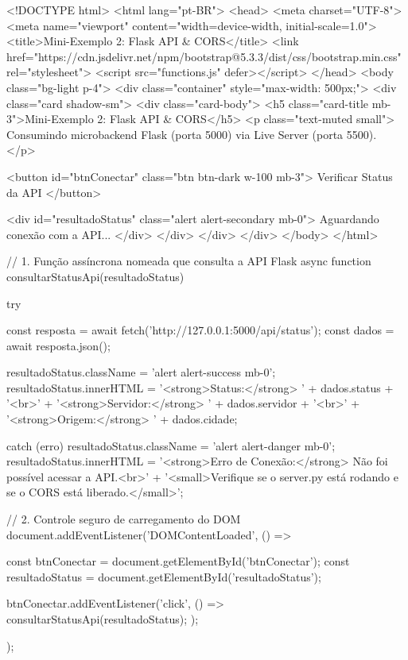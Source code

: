 \begin{boxCodigoHTML}
<!DOCTYPE html>
<html lang="pt-BR">
<head>
  <meta charset="UTF-8">
  <meta name="viewport" content="width=device-width, initial-scale=1.0">
  <title>Mini-Exemplo 2: Flask API & CORS</title>
  <link
    href="https://cdn.jsdelivr.net/npm/bootstrap@5.3.3/dist/css/bootstrap.min.css"
    rel="stylesheet">
  <script src="functions.js" defer></script>
</head>
<body class="bg-light p-4">
  <div class="container" style="max-width: 500px;">
    <div class="card shadow-sm">
      <div class="card-body">
        <h5 class="card-title mb-3">Mini-Exemplo 2: Flask API & CORS</h5>
        <p class="text-muted small">
          Consumindo microbackend Flask (porta 5000) via Live Server (porta 5500).
        </p>
        
        <button id="btnConectar" class="btn btn-dark w-100 mb-3">
          Verificar Status da API
        </button>

        <div id="resultadoStatus" class="alert alert-secondary mb-0">
          Aguardando conexão com a API...
        </div>
      </div>
    </div>
  </div>
</body>
</html>
\end{boxCodigoHTML}

\begin{boxCodigoJS}
// 1. Função assíncrona nomeada que consulta a API Flask
async function consultarStatusApi(resultadoStatus) {
  try {
    const resposta = await fetch('http://127.0.0.1:5000/api/status');
    const dados = await resposta.json();

    resultadoStatus.className = 'alert alert-success mb-0';
    resultadoStatus.innerHTML =
      '<strong>Status:</strong> ' + dados.status + '<br>' +
      '<strong>Servidor:</strong> ' + dados.servidor + '<br>' +
      '<strong>Origem:</strong> ' + dados.cidade;

  } catch (erro) {
    resultadoStatus.className = 'alert alert-danger mb-0';
    resultadoStatus.innerHTML =
      '<strong>Erro de Conexão:</strong> Não foi possível acessar a API.<br>' +
      '<small>Verifique se o server.py está rodando e se o CORS está liberado.</small>';
  }
}

// 2. Controle seguro de carregamento do DOM
document.addEventListener('DOMContentLoaded', () => {
  const btnConectar = document.getElementById('btnConectar');
  const resultadoStatus = document.getElementById('resultadoStatus');

  btnConectar.addEventListener('click', () => {
    consultarStatusApi(resultadoStatus);
  });
});
\end{boxCodigoJS}

